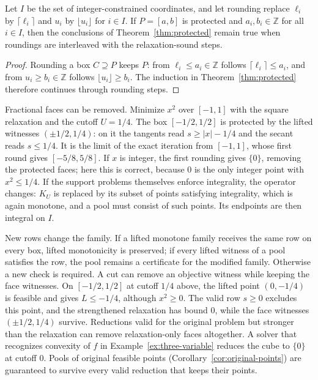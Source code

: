 \begin{proposition}\label{prop:integer-rounding}
Let $I$ be the set of integer-constrained coordinates, and let rounding
replace $\ell_i$ by $\lceil\ell_i\rceil$ and $u_i$ by $\lfloor u_i\rfloor$
for $i\in I$. If $P=[a,b]$ is protected and $a_i,b_i\in\mathbb Z$ for all
$i\in I$, then the conclusions of Theorem~\ref{thm:protected} remain true
when roundings are interleaved with the relaxation-sound steps.
\end{proposition}
\begin{proof}
Rounding a box $C\supseteq P$ keeps $P$: from $\ell_i\le a_i\in\mathbb Z$
follows $\lceil\ell_i\rceil\le a_i$, and from $u_i\ge b_i\in\mathbb Z$
follows $\lfloor u_i\rfloor\ge b_i$. The induction in
Theorem~\ref{thm:protected} therefore continues through rounding steps.
\end{proof}

Fractional faces can be removed. Minimize $x^2$ over $[-1,1]$ with the
square relaxation and the cutoff $U=1/4$. The box $[-1/2,1/2]$ is
protected by the lifted witnesses $(\pm1/2,1/4)$: on it the tangents read
$s\ge|x|-1/4$ and the secant reads $s\le1/4$. It is the limit of the exact
iteration from $[-1,1]$, whose first round gives $[-5/8,5/8]$. If $x$ is
integer, the first rounding gives $\{0\}$, removing the protected faces;
here this is correct, because $0$ is the only integer point with
$x^2\le1/4$. If the support problems themselves enforce integrality, the
operator changes: $K_U$ is replaced by its subset of points satisfying
integrality, which is again monotone, and a pool must consist of such
points. Its endpoints are then integral on $I$.

New rows change the family. If a lifted monotone family receives the same
row on every box, lifted monotonicity is preserved; if every lifted
witness of a pool satisfies the row, the pool remains a certificate for
the modified family. Otherwise a new check is required. A cut can remove
an objective witness while keeping the face witnesses. On $[-1/2,1/2]$ at
cutoff $1/4$ above, the lifted point $(0,-1/4)$ is feasible and gives
$L\le-1/4$, although $x^2\ge0$. The valid row $s\ge0$ excludes this point,
and the strengthened relaxation has bound $0$, while the face witnesses
$(\pm1/2,1/4)$ survive. Reductions valid for the original problem but
stronger than the relaxation can remove relaxation-only faces altogether.
A solver that recognizes convexity of $f$ in
Example~\ref{ex:three-variable} reduces the cube to $\{0\}$ at cutoff $0$.
Pools of original feasible points (Corollary~\ref{cor:original-points})
are guaranteed to survive every valid reduction that keeps their points.

